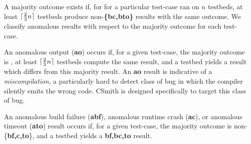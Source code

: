A majority outcome exists if, for for a particular test-case ran on $n$ testbeds, at least $\lceil\frac{2}{3}n\rceil$ testbeds produce non-\textbf{\{bc,bto\}} results with the same outcome. We classify anomalous results with respect to the majority outcome for each test-case.

An anomalous output (\textbf{ao}) occurs if, for a given test-case, the majority outcome is \textbf{\cmark}, at least $\lceil\frac{2}{3}n\rceil$ testbeds compute the same result, and a testbed yields a result which differs from this majority result. An \textbf{ao} result is indicative of a \emph{miscompilation}, a particularly hard to detect class of bug in which the compiler silently emits the wrong code. CSmith is designed specifically to target this class of bug.

An anomalous build failure (\textbf{abf}), anomalous runtime crash (\textbf{ac}), or anomalous timeout (\textbf{ato}) result occurs if, for a given test-case, the majority outcome is non-\{\textbf{bf,c,to}\}, and a testbed yields a \textbf{bf,bc,to} result.


%


